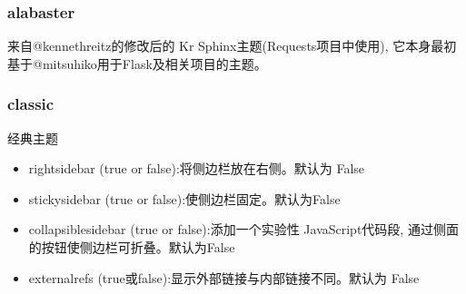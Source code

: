 \documentclass[a4paper,10pt,english]{sphinxmanual}
\begin{document}
\subsubsection{alabaster}
\label{\detokenize{sphinx_conf:alabaster}}
\sphinxAtStartPar
来自@kennethreitz的修改后的 Kr Sphinx主题(Requests项目中使用), 它本身最初基于@mitsuhiko用于Flask及相关项目的主题。


\subsubsection{classic}
\label{\detokenize{sphinx_conf:classic}}
\sphinxAtStartPar
经典主题
\begin{itemize}
\item {} 
\sphinxAtStartPar
rightsidebar (true or false):将侧边栏放在右侧。默认为 False

\item {} 
\sphinxAtStartPar
stickysidebar (true or false):使侧边栏固定。默认为False

\item {} 
\sphinxAtStartPar
collapsiblesidebar (true or false):添加一个实验性 JavaScript代码段, 通过侧面的按钮使侧边栏可折叠。默认为False

\item {} 
\sphinxAtStartPar
externalrefs (true或false):显示外部链接与内部链接不同。默认为 False

\end{itemize}
\end{document}

